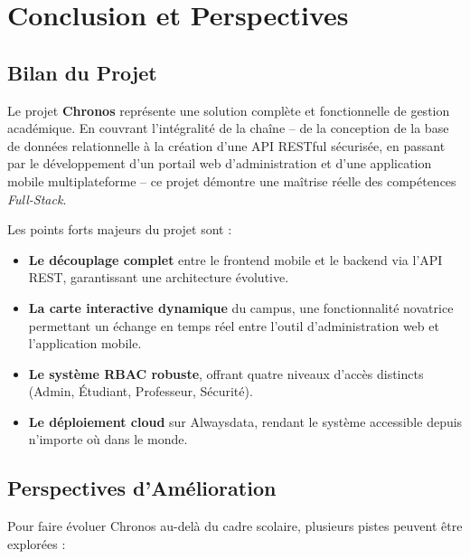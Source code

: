 \documentclass[12pt, a4paper]{report}
\begin{document}
\chapter{Conclusion et Perspectives}

\section{Bilan du Projet}

Le projet \textbf{Chronos} représente une solution complète et fonctionnelle de gestion académique. En couvrant l'intégralité de la chaîne -- de la conception de la base de données relationnelle à la création d'une API RESTful sécurisée, en passant par le développement d'un portail web d'administration et d'une application mobile multiplateforme -- ce projet démontre une maîtrise réelle des compétences \textit{Full-Stack}.

Les points forts majeurs du projet sont :

\begin{itemize}
    \item \textbf{Le découplage complet} entre le frontend mobile et le backend via l'API REST, garantissant une architecture évolutive.
    \item \textbf{La carte interactive dynamique} du campus, une fonctionnalité novatrice permettant un échange en temps réel entre l'outil d'administration web et l'application mobile.
    \item \textbf{Le système RBAC robuste}, offrant quatre niveaux d'accès distincts (Admin, Étudiant, Professeur, Sécurité).
    \item \textbf{Le déploiement cloud} sur Alwaysdata, rendant le système accessible depuis n'importe où dans le monde.
\end{itemize}

\section{Perspectives d'Amélioration}

Pour faire évoluer Chronos au-delà du cadre scolaire, plusieurs pistes peuvent être explorées :
\end{document}
